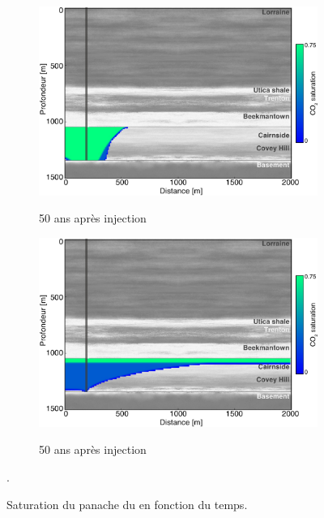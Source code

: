 \begin{figure}[!ht]
        \begin{subfigure}[b]{.47\textwidth}
                \caption{50 ans après injection }
                \includegraphics[width=\textwidth]{fig/50r.pdf}
                \label{fig:50r}
        \end{subfigure}
        \qquad
         \begin{subfigure}[b]{.47\textwidth}
                \caption{50 ans après injection}
                \includegraphics[width=\textwidth]{fig/50o.pdf}
                \label{fig:50o}
        \end{subfigure}
               
        \caption{Saturation du panache du  en fonction du temps.}
        \label{fig:co2_sat}.
\end{figure}
